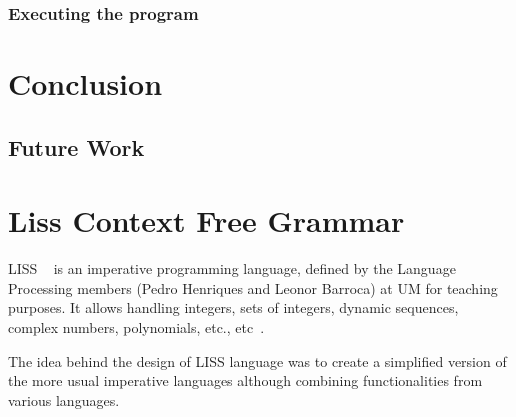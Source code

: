 \documentclass[
  oneside,
  11pt, a4paper,
  footinclude=true,
  headinclude=true,
  cleardoublepage=empty
]{scrbook}
\begin{document}
\subsection{Executing the program}










\chapter{Conclusion}
\section{Future Work}


	

	
	
	
	\chapter{Liss Context Free Grammar}

	LISS ~\citep{CH07a} is an imperative programming language, defined by the Language Processing members (Pedro Henriques and Leonor Barroca) at UM for teaching purposes.
	It allows handling integers, sets of integers, dynamic sequences, complex numbers, polynomials, etc., etc~\citep{CH07d,CH07a,CH06a,CH06b,CH05a}.

	The idea behind the design of LISS language was to create a simplified version of the more usual imperative languages although combining functionalities from various languages.
\end{document}
